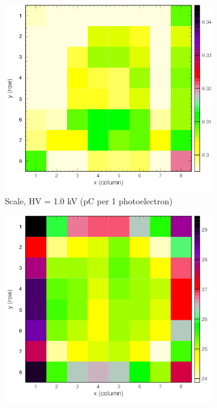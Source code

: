 \begin{figure}[t!]
	\centering
	\begin{subfigure}[c]{0.48\linewidth}
		\centering
		\includegraphics[width=\linewidth]{figures/pglobal_sc2d.png}
		\caption{Scale, HV = 1.0 kV (pC per 1 photoelectron)}
		\vspace{0mm}
	\end{subfigure}%
	\begin{subfigure}[c]{0.48\linewidth}
		\centering
		\includegraphics[width=\linewidth]{figures/pglobal_qe.png}

\end{subfigure}
\end{figure}
